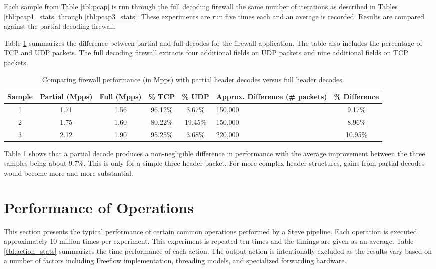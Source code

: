 Each sample from Table \ref{tbl:pcap} is run through the full decoding firewall the same number of iterations as described in Tables \ref{tbl:pcap1_stats} through \ref{tbl:pcap3_stats}. These experiments are run five times each and an average is recorded. Results are compared against the partial decoding firewall.

Table \ref{tbl:firewall_cmp} summarizes the difference between partial and full decodes for the firewall application. The table also includes the percentage of TCP and UDP packets. The full decoding firewall extracts four additional fields on UDP packets and nine additional fields on TCP packets. 

\begin{table}[ht]
\caption{Comparing firewall performance (in Mpps) with partial header decodes versus full header decodes.}
\begin{center}
\begin{tabularx}{\linewidth}{| c || c | c | c | c | X | c |}
\hline
Sample & Partial (Mpps) & Full (Mpps) & \% TCP & \% UDP & Approx. Difference (\# packets) & \% Difference \\
\hline
1 & 1.71 & 1.56 & 96.12\% & 3.67\% & 150,000 & 9.17\% \\
\hline
2 & 1.75 & 1.60 & 80.22\% & 19.45\% & 150,000 & 8.96\% \\
\hline
3 & 2.12 & 1.90 & 95.25\% & 3.68\% & 220,000 & 10.95\% \\ 
\hline
\end{tabularx}
\end{center}
\label{tbl:firewall_cmp}
\end{table}


Table \ref{tbl:firewall_cmp} shows that a partial decode produces a non-negligible difference in performance with the average improvement between the three samples being about 9.7\%. This is only for a simple three header packet. For more complex header structures, gains from partial decodes would become more and more substantial.


\section{Performance of Operations} \label{exp:action_performance}

This section presents the typical performance of certain common operations performed by a Steve pipeline. Each operation is executed approximately 10 million times per experiment. This experiment is repeated ten times and the timings are given as an average. Table \ref{tbl:action_stats} summarizes the time performance of each action. The output action is intentionally excluded as the results vary based on a number of factors including Freeflow implementation, threading models, and specialized forwarding hardware.

